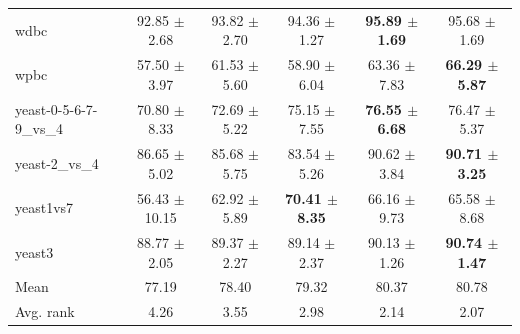 \begin{table}[t]
\begin{tabular}{lccccc}
wdbc & 92.85 $\pm$ 2.68 & 93.82 $\pm$ 2.70 & 94.36 $\pm$ 1.27 & \textbf{95.89 $\pm$ 1.69} & 95.68 $\pm$ 1.69 \\
wpbc & 57.50 $\pm$ 3.97 & 61.53 $\pm$ 5.60 & 58.90 $\pm$ 6.04 & 63.36 $\pm$ 7.83 & \textbf{66.29 $\pm$ 5.87} \\
yeast-0-5-6-7-9\_vs\_4 & 70.80 $\pm$ 8.33 & 72.69 $\pm$ 5.22 & 75.15 $\pm$ 7.55 & \textbf{76.55 $\pm$ 6.68} & 76.47 $\pm$ 5.37 \\
yeast-2\_vs\_4 & 86.65 $\pm$ 5.02 & 85.68 $\pm$ 5.75 & 83.54 $\pm$ 5.26 & 90.62 $\pm$ 3.84 & \textbf{90.71 $\pm$ 3.25} \\
yeast1vs7 & 56.43 $\pm$ 10.15 & 62.92 $\pm$ 5.89 & \textbf{70.41 $\pm$ 8.35} & 66.16 $\pm$ 9.73 & 65.58 $\pm$ 8.68 \\
yeast3 & 88.77 $\pm$ 2.05 & 89.37 $\pm$ 2.27 & 89.14 $\pm$ 2.37 & 90.13 $\pm$ 1.26 & \textbf{90.74 $\pm$ 1.47} \\
\midrule
Mean & 77.19 & 78.40 & 79.32 & 80.37 & 80.78 \\
Avg. rank & 4.26 & 3.55 & 2.98 & 2.14 & 2.07 \\
\bottomrule
\end{tabular}
\end{table}
